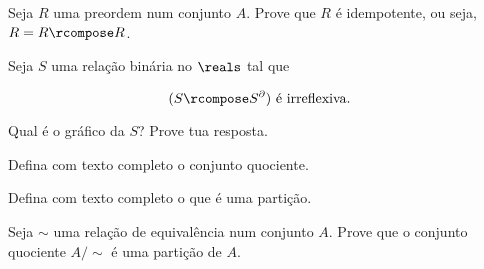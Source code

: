 \begin{exercise}
Seja $R$ uma preordem num conjunto $A$. Prove que $R$ é idempotente, ou seja, $R = R \rcompose R$.
\end{exercise}

\begin{exercise}
Seja $S$ uma relação binária no $\reals$ tal que

$$
    (S \rcompose S^{\partial}) \text{ é irreflexiva}.
$$

Qual é o gráfico da $S$? Prove tua resposta.
\end{exercise}

\begin{exercise}
Defina com texto completo o conjunto quociente.
\end{exercise} 

\begin{exercise}
Defina com texto completo o que é uma partição.
\end{exercise} 

\begin{exercise}
Seja $\sim$ uma relação de equivalência num conjunto $A$. Prove que o conjunto quociente $A/\sim$ é uma partição de $A$. 
\end{exercise} 
